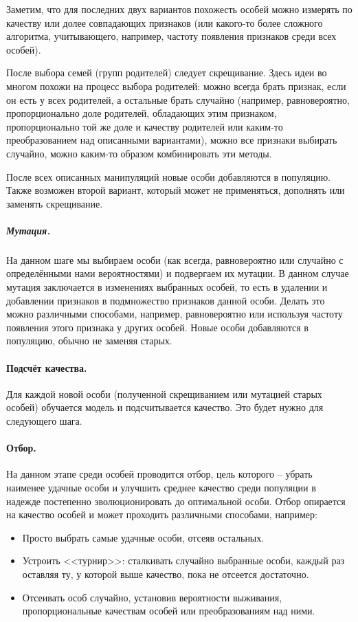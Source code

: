 \documentclass[12pt,fleqn]{article}
\begin{document}
	Заметим, что для последних двух вариантов похожесть особей можно измерять по качеству или долее совпадающих признаков (или какого-то более сложного алгоритма, учитывающего, например, частоту появления признаков среди всех особей).

	После выбора семей (групп родителей) следует скрещивание. Здесь идеи во многом похожи на процесс выбора родителей: можно всегда брать признак, если он есть у всех родителей, а остальные брать случайно (например, равновероятно, пропорционально доле родителей, обладающих этим признаком, пропорционально той же доле и качеству родителей или каким-то преобразованием над описанными вариантами), можно все признаки выбирать случайно, можно каким-то образом комбинировать эти методы.

	После всех описанных манипуляций новые особи добавляются в популяцию. Также возможен второй вариант, который может не применяться, дополнять или заменять скрещивание.

	\subparagraph*{Мутация.} На данном шаге мы выбираем особи (как всегда, равновероятно или случайно с определёнными нами вероятностями) и подвергаем их мутации. В данном случае мутация заключается в изменениях выбранных особей, то есть в удалении и добавлении признаков в подмножество признаков данной особи. Делать это можно различными способами, например, равновероятно или используя частоту появления этого признака у других особей. Новые особи добавляются в популяцию, обычно не заменяя старых.

	\paragraph*{Подсчёт качества.} Для каждой новой особи (полученной скрещиванием или мутацией старых особей) обучается модель и подсчитывается качество. Это будет нужно для следующего шага.

	\paragraph*{Отбор.} На данном этапе среди особей проводится отбор, цель которого -- убрать наименее удачные особи и улучшить среднее качество среди популяции в надежде постепенно эволюционировать до оптимальной особи. Отбор опирается на качество особей и может проходить различными способами, например:
	\begin{itemize}
		\item Просто выбрать самые удачные особи, отсеяв остальных.
		\item Устроить <<турнир>>: сталкивать случайно выбранные особи, каждый раз оставляя ту, у которой выше качество, пока не отсеется достаточно.
		\item Отсеивать особ случайно, установив вероятности выживания, пропорциональные качествам особей или преобразованиям над ними.
	\end{itemize}
\end{document}
